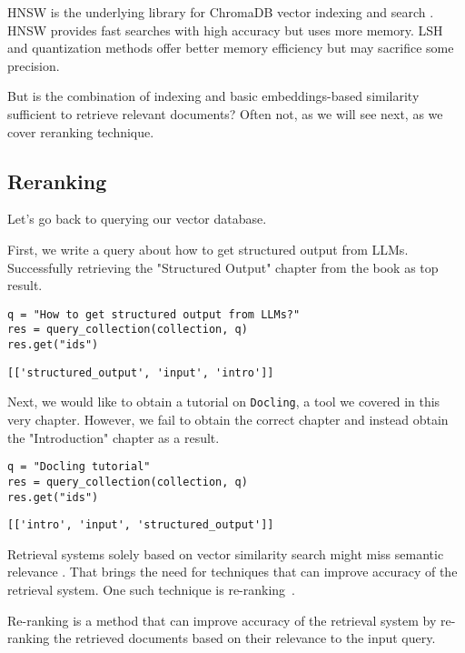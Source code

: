 HNSW is the underlying library for ChromaDB vector indexing and search . HNSW provides fast searches with high accuracy but uses more memory. LSH and quantization methods offer better memory efficiency but may sacrifice some precision.

But is the combination of indexing and basic embeddings-based similarity sufficient to retrieve relevant documents? Often not, as we will see next, as we cover reranking technique.

\subsection{Reranking}

Let's go back to querying our vector database.

First, we write a query about how to get structured output from LLMs. Successfully retrieving the "Structured Output" chapter from the book as top result.

\begin{verbatim}
q = "How to get structured output from LLMs?"
res = query_collection(collection, q)
res.get("ids")
\end{verbatim}

\begin{verbatim}
[['structured_output', 'input', 'intro']]
\end{verbatim}

Next, we would like to obtain a tutorial on \texttt{Docling}, a tool we covered in this very chapter. However, we fail to obtain the correct chapter and instead obtain the "Introduction" chapter as a result.

\begin{verbatim}
q = "Docling tutorial"
res = query_collection(collection, q)
res.get("ids")
\end{verbatim}

\begin{verbatim}
[['intro', 'input', 'structured_output']]
\end{verbatim}

Retrieval systems solely based on vector similarity search might miss semantic relevance . That brings the need for techniques that can improve accuracy of the retrieval system. One such technique is re-ranking~.

Re-ranking is a method that can improve accuracy of the retrieval system by re-ranking the retrieved documents based on their relevance to the input query.

